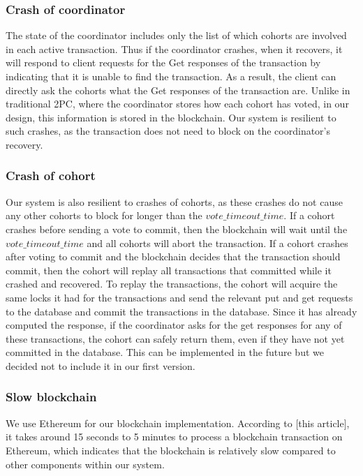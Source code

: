 \documentclass[11pt,conference]{IEEEtran}
\begin{document}
\subsubsection{Crash of coordinator}
The state of the coordinator includes only the list of which cohorts are involved in each active transaction. Thus if the coordinator crashes, when it recovers, it will respond to client requests for the Get responses of the transaction by indicating that it is unable to find the transaction. As a result, the client can directly ask the cohorts what the Get responses of the transaction are. Unlike in traditional 2PC, where the coordinator stores how each cohort has voted, in our design, this information is stored in the blockchain. Our system is resilient to such crashes, as the transaction does not need to block on the coordinator’s recovery.

\subsubsection{Crash of cohort}
Our system is also resilient to crashes of cohorts, as these crashes do not cause any other cohorts to block for longer than the $vote\_timeout\_time$.  If a cohort crashes before sending a vote to commit, then the blockchain will wait until the $vote\_timeout\_time$ and all cohorts will abort the transaction. If a cohort crashes after voting to commit and the blockchain decides that the transaction should commit, then the cohort will replay all transactions that committed while it crashed and recovered. To replay the transactions, the cohort will acquire the same locks it had for the transactions and send the relevant put and get requests to the database and commit the transactions in the database. Since it has already computed the response, if the coordinator asks for the get responses for any of these transactions, the cohort can safely return them, even if they have not yet committed in the database. This can be implemented in the future but we decided not to include it in our first version. 

\subsubsection{Slow blockchain}
We use Ethereum for our blockchain implementation. According to [this article], it takes around 15 seconds to 5 minutes to process a blockchain transaction on Ethereum, which indicates that the blockchain is relatively slow compared to other components within our system.
\end{document}
